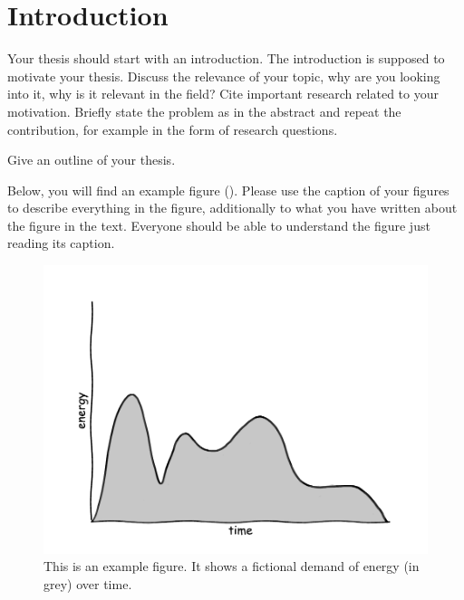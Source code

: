 \chapter{Introduction}
\label{ch:Introduction}

Your thesis should start with an introduction. The introduction is supposed to motivate your thesis.
Discuss the relevance of your topic, why are you looking into it, why is it relevant in the field? Cite important research related to your motivation.
Briefly state the problem as in the abstract and repeat the contribution, for example in the form of research questions. 

Give an outline of your thesis.


Below, you will find an example figure (). Please use the caption of your figures to describe everything in the figure, additionally to what you have written about the figure in the text. Everyone should be able to understand the figure just reading its caption.

\begin{figure}[h!]%
\centering
\includegraphics[width=0.5\columnwidth]{plots/Figure_2_demand}%
\caption{This is an example figure. It shows a fictional demand of energy (in grey) over time.}%
\label{fig:example}%
\end{figure}
